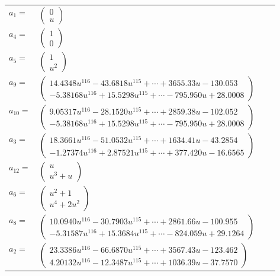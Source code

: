 \documentclass[1p]{elsarticle_modified}
\theoremstyle{definition}
\begin{document}
\begin{tabular}{m{7pt} m{180pt} m{7pt} m{180pt} }
\flushright $a_{1}=$&$\begin{pmatrix}0\\u\end{pmatrix}$ \\
\flushright $a_{4}=$&$\begin{pmatrix}1\\0\end{pmatrix}$ \\
\flushright $a_{5}=$&$\begin{pmatrix}1\\u^2\end{pmatrix}$ \\
\flushright $a_{9}=$&$\begin{pmatrix}14.4348 u^{116}-43.6818 u^{115}+\cdots+3655.33 u-130.053\\-5.38168 u^{116}+15.5298 u^{115}+\cdots-795.950 u+28.0008\end{pmatrix}$ \\
\flushright $a_{10}=$&$\begin{pmatrix}9.05317 u^{116}-28.1520 u^{115}+\cdots+2859.38 u-102.052\\-5.38168 u^{116}+15.5298 u^{115}+\cdots-795.950 u+28.0008\end{pmatrix}$ \\
\flushright $a_{3}=$&$\begin{pmatrix}18.3661 u^{116}-51.0532 u^{115}+\cdots+1634.41 u-43.2854\\-1.27374 u^{116}+2.87521 u^{115}+\cdots+377.420 u-16.6565\end{pmatrix}$ \\
\flushright $a_{12}=$&$\begin{pmatrix}u\\u^3+u\end{pmatrix}$ \\
\flushright $a_{6}=$&$\begin{pmatrix}u^2+1\\u^4+2 u^2\end{pmatrix}$ \\
\flushright $a_{8}=$&$\begin{pmatrix}10.0940 u^{116}-30.7903 u^{115}+\cdots+2861.66 u-100.955\\-5.31587 u^{116}+15.3684 u^{115}+\cdots-824.059 u+29.1264\end{pmatrix}$ \\
\flushright $a_{2}=$&$\begin{pmatrix}23.3386 u^{116}-66.6870 u^{115}+\cdots+3567.43 u-123.462\\4.20132 u^{116}-12.3487 u^{115}+\cdots+1036.39 u-37.7570\end{pmatrix}$ \\

\end{tabular}
\end{document}
